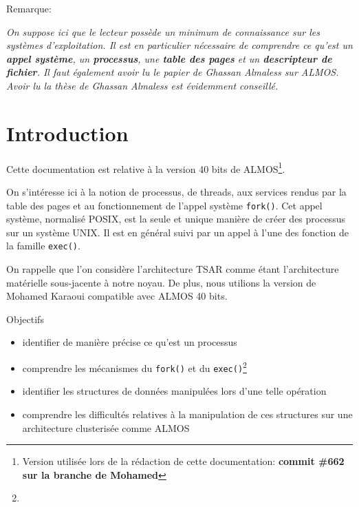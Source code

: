 \begin{paragraph}{Remarque:}

  \textit{On suppose ici que le lecteur possède un minimum de connaissance sur
          les systèmes d'exploitation. Il est en particulier nécessaire de
                  comprendre ce qu'est un \textbf{appel système}, un
                  \textbf{processus}, une \textbf{table des pages} et un
                  \textbf{descripteur de fichier}. Il faut également avoir lu le
                  papier de Ghassan Almaless sur ALMOS\cite{almos-cfse}. Avoir
                  lu la thèse de Ghassan Almaless est évidemment
                  conseillé\cite{almos-phd}.}

\end{paragraph}


\section{Introduction}

  Cette documentation est relative à la version 40 bits de
  ALMOS\footnote{Version utilisée lors de la rédaction de cette documentation:
          \textbf{commit \#662 sur la branche de Mohamed}}.

  On s'intéresse ici à la notion de processus, de threads, aux services rendus
  par la table des pages et au fonctionnement de l'appel système
  \texttt{fork()}. Cet appel système, normalisé POSIX\cite{posix}, est la seule
  et unique manière de créer des processus sur un système UNIX. Il est en
  général suivi par un appel à l'une des fonction de la famille \texttt{exec()}.

  On rappelle que l'on considère l'architecture TSAR\cite{tsar} comme étant
  l'architecture matérielle sous-jacente à notre noyau. De plus, nous utilions
  la version de Mohamed Karaoui compatible avec ALMOS 40 bits.

  \begin{paragraph}{Objectifs}
    \begin{itemize}
  
        \item identifier de manière précise ce qu'est un processus
  
        \item comprendre les mécanismes du \texttt{fork()} et du
        \texttt{exec()\footnote{}}
          
        \item identifier les structures de données manipulées lors d'une telle
        opération
          
        \item comprendre les difficultés relatives à la manipulation de ces
        structures sur une architecture clusterisée comme ALMOS
          
    \end{itemize}
  \end{paragraph}

